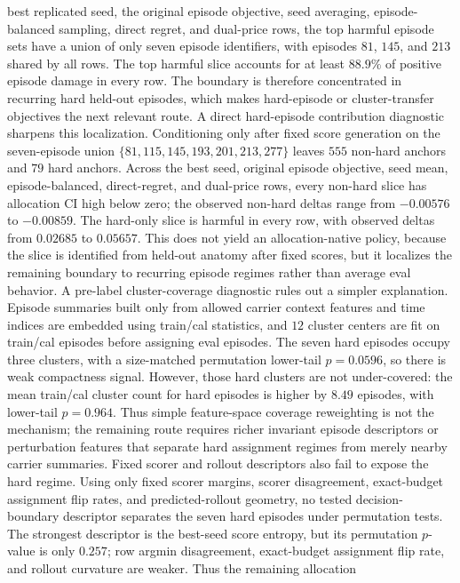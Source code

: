 best replicated seed, the original episode objective, seed averaging,
episode-balanced sampling, direct regret, and dual-price rows, the top harmful
episode sets have a union of only seven episode identifiers, with episodes
$81$, $145$, and $213$ shared by all rows.  The top harmful slice accounts for
at least $88.9\%$ of positive episode damage in every row.  The boundary is
therefore concentrated in recurring hard held-out episodes, which makes
hard-episode or cluster-transfer objectives the next relevant route.
A direct hard-episode contribution diagnostic sharpens this localization.
Conditioning only after fixed score generation on the seven-episode union
$\{81,115,145,193,201,213,277\}$ leaves $555$ non-hard anchors and $79$ hard
anchors.  Across the best seed, original episode objective, seed mean,
episode-balanced, direct-regret, and dual-price rows, every non-hard slice
has allocation CI high below zero; the observed non-hard deltas range from
$-0.00576$ to $-0.00859$.  The hard-only slice is harmful in every row, with
observed deltas from $0.02685$ to $0.05657$.  This does not yield an
allocation-native policy, because the slice is identified from held-out
anatomy after fixed scores, but it localizes the remaining boundary to
recurring episode regimes rather than average eval behavior.
A pre-label cluster-coverage diagnostic rules out a simpler explanation.
Episode summaries built only from allowed carrier context features and time
indices are embedded using train/cal statistics, and $12$ cluster centers are
fit on train/cal episodes before assigning eval episodes.  The seven hard
episodes occupy three clusters, with a size-matched permutation lower-tail
$p=0.0596$, so there is weak compactness signal.  However, those hard clusters
are not under-covered: the mean train/cal cluster count for hard episodes is
higher by $8.49$ episodes, with lower-tail $p=0.964$.  Thus simple
feature-space coverage reweighting is not the mechanism; the remaining route
requires richer invariant episode descriptors or perturbation features that
separate hard assignment regimes from merely nearby carrier summaries.
Fixed scorer and rollout descriptors also fail to expose the hard regime.
Using only fixed scorer margins, scorer disagreement, exact-budget assignment
flip rates, and predicted-rollout geometry, no tested decision-boundary
descriptor separates the seven hard episodes under permutation tests.  The
strongest descriptor is the best-seed score entropy, but its permutation
$p$-value is only $0.257$; row argmin disagreement, exact-budget assignment
flip rate, and rollout curvature are weaker.  Thus the remaining allocation
